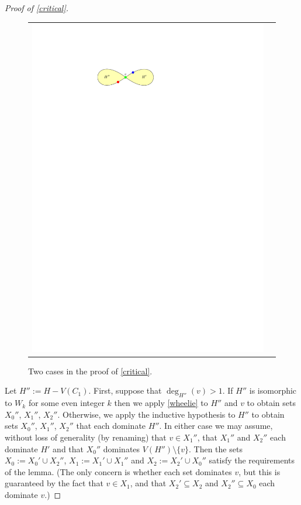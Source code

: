 \documentclass[a4paper,UKenglish,cleveref, autoref, thm-restate]{lipics-v2021}
\begin{document}
\begin{proof}[Proof of \cref{critical}]
\begin{figure}[htbp]
\begin{tabular}{cc}
      \includegraphics[page=2]{figs/critical_3_colouring}
    \end{tabular}
    \caption{Two cases in the proof of \cref{critical}.}
    \label{critical_3_colouring}
  \end{figure}

  Let $H'':=H-V(C_1)$. First, suppose that $\deg_{H''}(v)>1$.
  If $H''$ is isomorphic to $W_k$ for some even integer $k$ then we apply \cref{wheelie} to $H''$ and $v$ to obtain sets $X_0''$, $X_1''$, $X_2''$. Otherwise, we apply the inductive hypothesis to $H''$ to obtain sets $X_0''$, $X_1''$, $X_2''$ that each dominate $H''$. In either case we may assume, without loss of generality (by renaming) that $v\in X_1''$, that $X_1''$ and $X_2''$ each dominate $H'$ and that $X_0''$ dominates $V(H'')\setminus\{v\}$.  Then the sets $X_0:=X_0'\cup X_2''$, $X_1:=X_1'\cup X_1''$ and $X_2:=X_2'\cup X_0''$ satisfy the requirements of the lemma.  (The only concern is whether each set dominates $v$, but this is guaranteed by the fact that $v\in X_1$, and that $X_2'\subseteq X_2$ and $X_2''\subseteq X_0$ each dominate $v$.)


\end{proof}
\end{document}
